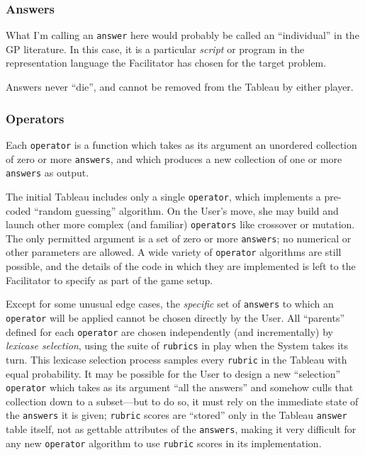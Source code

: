 \subsubsection{Answers}\hypertarget{answers}{}\label{answers}

What I'm calling an {\tt answer} here would probably be called an ``individual'' in the GP literature. In this case, it is a particular \emph{script} or program in the representation language the Facilitator has chosen for the target problem.

Answers never ``die'', and cannot be removed from the Tableau by either player.

\subsubsection{Operators}\hypertarget{operators}{}\label{operators}

Each {\tt operator} is a function which takes as its argument an unordered  collection of zero or more {\tt answers}, and which produces a new collection of one or more {\tt answers} as output.

The initial Tableau includes only a single {\tt operator}, which implements a pre-coded ``random guessing'' algorithm. On the User's move, she may build and launch other more complex (and familiar) {\tt operators} like crossover or mutation. The only permitted argument is a set of zero or more {\tt answers}; no numerical or other parameters are allowed. A wide variety of {\tt operator} algorithms are still possible, and the details of the code in which they are implemented is left to the Facilitator to specify as part of the game setup.

Except for some unusual edge cases, the \emph{specific} set of {\tt answers} to which an {\tt operator} will be applied cannot be chosen directly by the User. All ``parents'' defined for each {\tt operator} are chosen independently (and incrementally) by \emph{lexicase selection}, using the suite of {\tt rubrics} in play when the System takes its turn. This lexicase selection process samples every {\tt rubric} in the Tableau with equal probability. It may be possible for the User to design a new ``selection'' {\tt operator} which takes as its argument ``all the answers'' and somehow culls that collection down to a subset---but to do so, it must rely on the immediate state of the {\tt answers} it is given; {\tt rubric} scores are ``stored'' only in the Tableau {\tt answer} table itself, not as gettable attributes of the {\tt answers}, making it very difficult for any new {\tt operator} algorithm to use {\tt rubric} scores in its implementation.

